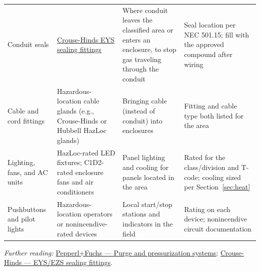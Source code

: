 \begin{longtable}{@{}P{2.93cm}P{4.48cm}P{4.10cm}P{3.71cm}@{}}
Conduit seals & \href{https://www.eaton.com/content/dam/eaton/products/conduit-cable-and-wire-management/crouse-hinds/catalog-pages/crouse-hinds-eys-ezs-conduit-sealing-fittings-catalog-page.pdf}{Crouse-Hinds EYS sealing fittings} & Where conduit leaves the classified area or enters an enclosure, to stop gas traveling through the conduit & Seal location per NEC 501.15; fill with the approved compound after wiring \\
Cable and cord fittings & Hazardous-location cable glands (e.g., Crouse-Hinds or Hubbell HazLoc glands) & Bringing cable (instead of conduit) into enclosures & Fitting and cable type both listed for the area \\
Lighting, fans, and AC units & HazLoc-rated LED fixtures; C1D2-rated enclosure fans and air conditioners & Panel lighting and cooling for panels located in the area & Rated for the class/division and T-code; cooling sized per Section~\ref{sec:heat} \\
Pushbuttons and pilot lights & Hazardous-location operators or nonincendive-rated devices & Local start/stop stations and indicators in the field & Rating on each device; nonincendive circuit documentation \\
\bottomrule
\end{longtable}

\textit{Further reading:} \href{https://www.pepperl-fuchs.com/en-us/products/hazardous-area-products-and-solutions/purge-and-pressurization-systems-gp32661}{Pepperl+Fuchs --- Purge and pressurization systems}; \href{https://www.eaton.com/content/dam/eaton/products/conduit-cable-and-wire-management/crouse-hinds/catalog-pages/crouse-hinds-eys-ezs-conduit-sealing-fittings-catalog-page.pdf}{Crouse-Hinds --- EYS/EZS sealing fittings}.
